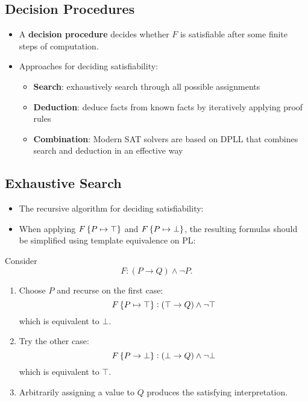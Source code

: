 \subsection{Decision Procedures}
\begin{itemize}
	\item A \textbf{decision procedure} decides whether $F$ is satisfiable after some finite steps of computation.
	\item Approaches for deciding satisfiability:
	\begin{itemize}
		\item \textbf{Search}: exhaustively search through all possible assignments
		\item \textbf{Deduction}: deduce facts from known facts by iteratively applying proof rules
		\item \textbf{Combination}: Modern SAT solvers are based on DPLL that combines search and deduction in an effective way
	\end{itemize}
\end{itemize}

\subsection{Exhaustive Search}
\begin{itemize}
	\item The recursive algorithm for deciding satisfiability:
	\item When applying $F\set{P\mapsto\top}$ and $F\set{P\mapsto\bot}$, the resulting formulas should be simplified using template equivalence on PL:
\end{itemize}
\begin{example}
	Consider \[
	F:(P\to Q)\land\lnot P.
	\] \begin{enumerate}
		\item Choose $P$ and recurse on the first case: \[
		F\set{P\mapsto \top}:(\top\to Q)\land\lnot\top
		\] which is equivalent to $\bot$.
		\item Try the other case: \[
		F\set{P\to\bot}:(\bot\to Q)\land\lnot\bot
		\] which is equivalent to $\top$.
		\item Arbitrarily assigning a value to $Q$ produces the satisfying interpretation.
	\end{enumerate}
\end{example}

